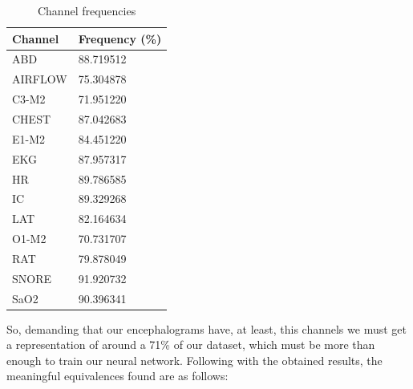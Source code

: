 \begin{table}[!h]
\begin{center}
\begin{tabular}{ |p{3cm}||p{3cm}| }
 \hline
 Channel & Frequency (\%)\\
 \hline
 ABD & 88.719512 \\ 
 AIRFLOW & 75.304878 \\  
 C3-M2 & 71.951220 \\
 CHEST & 87.042683 \\
 E1-M2 & 84.451220 \\
 EKG & 87.957317 \\
 HR & 89.786585 \\
 IC & 89.329268 \\
 LAT & 82.164634 \\
 O1-M2 & 70.731707 \\
 RAT & 79.878049 \\
 SNORE & 91.920732 \\
 SaO2 & 90.396341 \\
 \hline
\end{tabular}
\end{center}
\caption{Channel frequencies}
\label{tab1}
\end{table}

So, demanding that our encephalograms have, at least, this channels we must get a representation of around a 71\% of our dataset, which must be more than enough to train our neural network. Following with the obtained results, the meaningful equivalences found are as follows:

